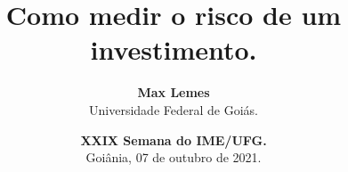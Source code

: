\title
  {
    Como medir o risco de um investimento.
  }

\author[M. ~Lemes] %
  {
   \textbf{Max Lemes} \\
   Universidade Federal de Goiás.
  }



\date[Goiânia, 07 de outubro de 2021]
  {
    \textcolor{UFGorange}{\textbf{XXIX Semana do IME/UFG.}}\\
    Goiânia, 07 de outubro de 2021.
  }